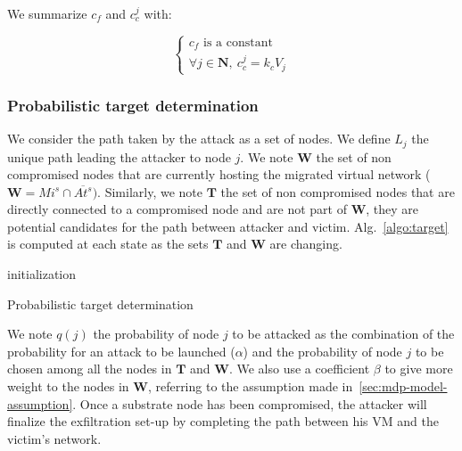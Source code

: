 We summarize $c_f$ and $c_c^j$ with:

\begin{equation}
  \begin{cases}
    c_f\text{ is a constant}\\
   \forall j \in \textbf{N},~ c_c^j = k_{c}  V_j 
  \end{cases}
\end{equation}

\subsubsection{Probabilistic target determination}
\label{sec:target_proba}
We consider the path taken by the attack as a set of nodes.
We define $L_j$ the unique path leading the attacker to node $j$.
We note $\textbf{W}$ the set of non compromised nodes that are currently hosting the migrated virtual network (\ie $\textbf{W} = Mi^s \cap \overline{At^s})$.
Similarly, we note $\textbf{T}$ the set of non compromised nodes that are directly connected to a compromised node and are not part of $\textbf{W}$, \ie they are potential candidates for the path between attacker and victim. Alg.~\ref{algo:target} is computed at each state as the sets $\textbf{T}$ and $\textbf{W}$ are changing.
\begin{algorithm}
 initialization\;
 \caption{Probabilistic target determination}
 \label{algo:target}
\end{algorithm}


We note $q(j)$ the probability of node $j$ to be attacked as the combination of the probability for an attack to be launched (\ie $\alpha$) and the probability of node $j$ to be chosen among all the nodes in $\textbf{T}$ and $\textbf{W}$. We also use a coefficient $\beta$ to give more weight to the nodes in $\textbf{W}$, referring to the assumption made in~\ref{sec:mdp-model-assumption}.
Once a substrate node has been compromised, the attacker will finalize the exfiltration set-up by completing the path between his VM and the victim's network.


